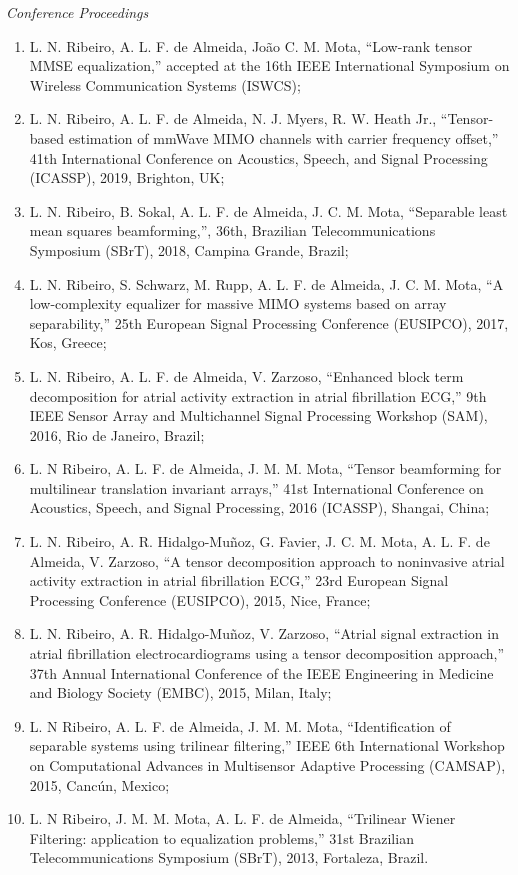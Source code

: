 {\sl Conference Proceedings}

\begin{enumerate}
	\item L. N. Ribeiro, A. L. F. de Almeida, Jo\~ao C. M. Mota, ``Low-rank tensor MMSE equalization,'' accepted at the 16th IEEE International Symposium on Wireless Communication Systems (ISWCS);
			
	\item L. N. Ribeiro, A. L. F. de Almeida, N. J. Myers, R. W. Heath Jr., ``Tensor-based estimation of mmWave MIMO channels with carrier frequency offset,'' 41th International Conference on Acoustics, Speech, and Signal Processing (ICASSP), 2019, Brighton, UK;
	
	\item L. N. Ribeiro, B. Sokal, A. L. F. de Almeida, J. C. M. Mota, ``Separable least mean squares beamforming,'', 36th, Brazilian Telecommunications Symposium (SBrT), 2018, Campina Grande, Brazil;
	
	\item L. N. Ribeiro, S. Schwarz, M. Rupp, A. L. F. de Almeida, J. C. M. Mota, ``A low-complexity equalizer for massive MIMO systems based on array separability,'' 25th European Signal Processing Conference (EUSIPCO), 2017, Kos, Greece;
	
	\item L. N. Ribeiro, A. L. F. de Almeida, V. Zarzoso, ``Enhanced block term decomposition for atrial activity extraction in atrial fibrillation ECG,'' 9th IEEE Sensor Array and Multichannel Signal Processing Workshop (SAM), 2016, Rio de Janeiro, Brazil;
	
	\item L. N Ribeiro,  A. L. F. de Almeida, J. M. M. Mota, ``Tensor beamforming for multilinear translation invariant arrays,'' 41st International Conference on Acoustics, Speech, and Signal Processing, 2016 (ICASSP), Shangai, China;
	
	\item  L. N. Ribeiro, A. R. Hidalgo-Mu\~{n}oz, G. Favier, J. C. M. Mota, A. L. F. de Almeida,  V. Zarzoso, ``A tensor decomposition approach to noninvasive atrial activity extraction in atrial fibrillation ECG,'' 23rd European Signal Processing Conference (EUSIPCO), 2015, Nice, France;
	
	\item L. N. Ribeiro, A. R. Hidalgo-Mu\~{n}oz, V. Zarzoso, ``Atrial signal extraction in atrial fibrillation electrocardiograms using a tensor decomposition approach,'' 37th Annual International Conference of the IEEE Engineering in Medicine and Biology Society (EMBC), 2015, Milan, Italy;
	
	 \item L. N Ribeiro,  A. L. F. de Almeida, J. M. M. Mota, ``Identification of separable systems using trilinear filtering,'' IEEE 6th International Workshop on Computational Advances in Multisensor Adaptive Processing (CAMSAP), 2015, Canc\'{u}n, Mexico;
	
	 \item L. N Ribeiro, J. M. M. Mota, A. L. F. de Almeida, ``Trilinear Wiener Filtering: application to equalization problems,''  31st Brazilian Telecommunications Symposium (SBrT), 2013, Fortaleza, Brazil.
\end{enumerate}